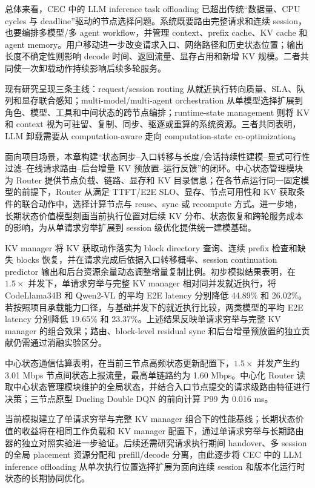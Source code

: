 总体来看，CEC 中的 LLM inference task offloading 已超出传统“数据量、CPU cycles 与 deadline”驱动的节点选择问题。系统既要路由完整请求和连续 session，也要编排多模型/多 agent workflow，并管理 context、prefix cache、KV cache 和 agent memory。用户移动进一步改变请求入口、网络路径和历史状态位置；输出长度不确定性则影响 decode 时间、返回流量、显存占用和新增 KV 规模。二者共同使一次卸载动作持续影响后续多轮服务。

现有研究呈现三条主线：request/session routing 从就近执行转向质量、SLA、队列和显存联合感知；multi-model/multi-agent orchestration 从单模型选择扩展到角色、模型、工具和中间状态的跨节点编排；runtime-state management 则将 KV 和 context 视为可驻留、复制、同步、驱逐或重算的系统资源。三者共同表明，LLM 卸载需要从 computation-aware 走向 computation-state co-optimization。

面向项目场景，本章构建“状态同步--入口转移与长度/会话持续性建模--显式可行性过滤--在线请求路由--后台增量 KV 预放置--运行反馈”的闭环。中心状态管理模块为 Router 提供节点负载、链路、显存和 KV 目录信息；在各节点运行同一固定模型的前提下，Router 从满足 TTFT/E2E SLO、显存、节点可用性和 KV 获取条件的联合动作中，选择计算节点与 reuse、sync 或 recompute 方式。进一步地，长期状态价值模型刻画当前执行位置对后续 KV 分布、状态恢复和跨轮服务成本的影响，为从单请求穷举扩展到 session 级优化提供统一建模基础。

KV manager 将 KV 获取动作落实为 block directory 查询、连续 prefix 检查和缺失 blocks 恢复，并在请求完成后依据入口转移概率、session continuation predictor 输出和后台资源余量动态调整增量复制比例。初步模拟结果表明，在 \(1.5\times\) 并发下，单请求穷举与完整 KV manager 相对同并发就近执行，将 CodeLlama34B 和 Qwen2-VL 的平均 E2E latency 分别降低 44.89\% 和 26.02\%。若按照项目承载能力口径，与基础并发下的就近执行比较，两类模型的平均 E2E latency 分别降低 19.65\% 和 23.37\%。上述结果反映单请求穷举与完整 KV manager 的组合效果；路由、block-level residual sync 和后台增量预放置的独立贡献仍需通过消融实验区分。

中心状态通信估算表明，在当前三节点高频状态更新配置下，\(1.5\times\) 并发产生约 3.01 Mbps 节点间状态上报流量，最高单链路约为 1.60 Mbps。中心化 Router 读取中心状态管理模块维护的全局状态，并结合入口节点提交的请求级路由特征进行决策；三节点原型 Dueling Double DQN 的前向计算 P99 为 0.016 ms。

当前模拟建立了单请求穷举与完整 KV manager 组合下的性能基线；长期状态价值的收益将在相同工作负载和 KV manager 配置下，通过单请求穷举与长期路由器的独立对照实验进一步验证。后续还需研究请求执行期间 handover、多 session 的全局 placement 资源分配和 prefill/decode 分离，由此逐步将 CEC 中的 LLM inference offloading 从单次执行位置选择扩展为面向连续 session 和版本化运行时状态的长期协同优化。

